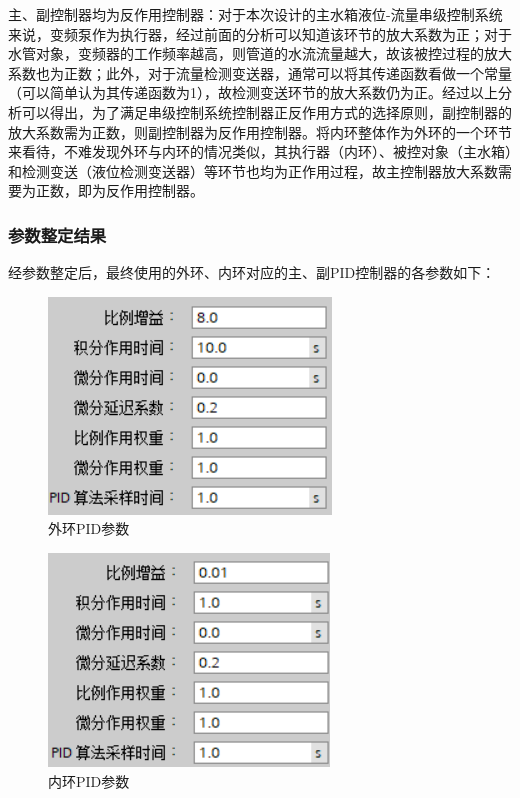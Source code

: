 \documentclass[UTF8]{article}
\begin{document}
主、副控制器均为反作用控制器：对于本次设计的主水箱液位-流量串级控制系统来说，变频泵作为执行器，经过前面的分析可以知道该环节的放大系数为正；对于水管对象，变频器的工作频率越高，则管道的水流流量越大，故该被控过程的放大系数也为正数；此外，对于流量检测变送器，通常可以将其传递函数看做一个常量（可以简单认为其传递函数为1），故检测变送环节的放大系数仍为正。经过以上分析可以得出，为了满足串级控制系统控制器正反作用方式的选择原则，副控制器的放大系数需为正数，则副控制器为反作用控制器。将内环整体作为外环的一个环节来看待，不难发现外环与内环的情况类似，其执行器（内环）、被控对象（主水箱）和检测变送（液位检测变送器）等环节也均为正作用过程，故主控制器放大系数需要为正数，即为反作用控制器。

\subsubsection{参数整定结果}
经参数整定后，最终使用的外环、内环对应的主、副PID控制器的各参数如下：
\begin{figure}[H]
    \centering %
    \includegraphics[width=.4\textwidth]{figure/串级-外环液位-模块-PID参数.PNG} 
    \caption{外环PID参数} %
\end{figure}
\begin{figure}[H]
    \centering %
    \includegraphics[width=.4\textwidth]{figure/串级-内环流量-模块-PID参数.PNG} 
    \caption{内环PID参数} %
\end{figure}
\end{document}

